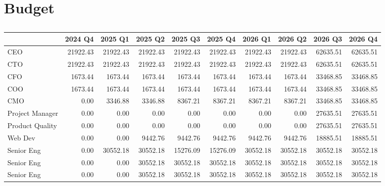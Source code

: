 \section{Budget} \label{sec:sed-ultrices}


\begin{table}[h]
\caption{}
\footnotesize
\begin{tabular}{lrrrrrrrrr} 
\toprule
 &2024 Q4  &2025 Q1 &2025 Q2 &2025 Q3 &2025 Q4 &2026 Q1 &2026 Q2&2026 Q3 &2026 Q4 \\ \hline
CEO                              & 21922.43 & 21922.43 & 21922.43 & 21922.43 & 21922.43 & 21922.43 & 21922.43 & 62635.51 & 62635.51\\
CTO                              & 21922.43 & 21922.43 & 21922.43 & 21922.43 & 21922.43 & 21922.43 & 21922.43 & 62635.51 & 62635.51\\
CFO                              & 1673.44  & 1673.44  & 1673.44  & 1673.44  & 1673.44  & 1673.44  & 1673.44  & 33468.85 & 33468.85\\
COO                              & 1673.44  & 1673.44  & 1673.44  & 1673.44  & 1673.44  & 1673.44  & 1673.44  & 33468.85 & 33468.85\\
CMO                              & 0.00     & 3346.88  & 3346.88  & 8367.21  & 8367.21  & 8367.21  & 8367.21  & 33468.85 & 33468.85\\
Project Manager     & 0.00     & 0.00     & 0.00     & 0.00     & 0.00     & 0.00     & 0.00     & 27635.51 & 27635.51\\
Product Quality      & 0.00     & 0.00     & 0.00     & 0.00     & 0.00     & 0.00     & 0.00     & 27635.51 & 27635.51\\
Web Dev                 & 0.00     & 0.00     & 9442.76  & 9442.76  & 9442.76  & 9442.76  & 9442.76  & 18885.51 & 18885.51\\
Senior Eng                       & 0.00     & 30552.18 & 30552.18 & 15276.09 & 15276.09 & 30552.18 & 30552.18 & 30552.18 & 30552.18\\
Senior Eng                       & 0.00     & 0.00     & 30552.18 & 30552.18 & 30552.18 & 30552.18 & 30552.18 & 30552.18 & 30552.18\\
Senior Eng                       & 0.00     & 0.00     & 30552.18 & 30552.18 & 30552.18 & 30552.18 & 30552.18 & 30552.18 & 30552.18\\

\end{tabular}
\end{table}
